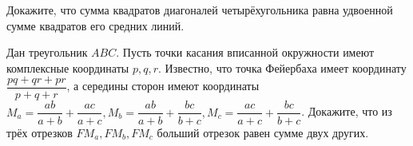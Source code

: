 Докажите, что сумма квадратов диагоналей четырёхугольника равна удвоенной сумме квадратов его средних линий.

\newpage

\hspace{3mm}

 Дан треугольник $ABC$. Пусть точки касания вписанной окружности имеют комплексные координаты $p,q,r$. Известно, что точка Фейербаха имеет координату $\dfrac{pq+qr+pr}{p+q+r}$, а середины сторон имеют координаты $M_a = \dfrac{ab}{a+b}+\dfrac{ac}{a+c}, M_b = \dfrac{ab}{a+b} + \dfrac{bc}{b+c}, M_{c} = \dfrac{ac}{a+c} + \dfrac{bc}{b+c}$. Докажите, что из трёх отрезков $FM_{a}, FM_{b}, FM_{c}$ больший отрезок равен сумме двух других.